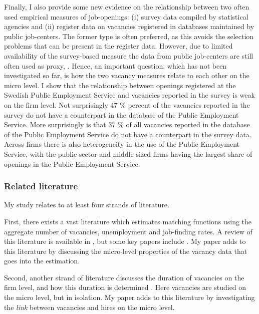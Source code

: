 Finally, I also provide some new evidence on the relationship between two often used empirical measures of job-openings: (i) survey data compiled by statistical agencies and (ii) register data on vacancies registered in databases maintained by public job-centers. The former type is often preferred, as this avoids the selection problems that can be present in the register data. However, due to limited availability of the survey-based measure \citep{Elsby2015} the data from public job-centers are still often used as proxy, \citep{Berman1997, Carlsson2013, Hansen2004,  Wall2002, Yashiv2000}. Hence, an important question, which has not been investigated so far, is how the two vacancy measures relate to each other on the micro level. I show that the relationship between openings registered at the Swedish Public Employment Service and vacancies reported in the survey is weak on the firm level. Not surprisingly 47 \% percent of the vacancies reported in the survey do not have a counterpart in the database of the Public Employment Service. More surprisingly is that 37 \% of all vacancies reported in the database of the Public Employment Service do not have a counterpart in the survey data. Across firms there is also heterogeneity in the use of the Public Employment Service, with the public sector and middle-sized firms having the largest share of openings in the Public Employment Service. 

\subsubsection{Related literature}

My study relates to at least four strands of literature. 

First, there exists a vast literature which estimates matching functions using the aggregate number of vacancies, unemployment and job-finding rates. A review of this literature is available in \cite{Pissarides2000}, but some key papers include \cite{Blanchard1990, Berman1997, Yashiv2000, Hansen2004, Sunde2007, Gross1997, Entorf1998, Feve1996}. My paper adds to this literature by discussing the micro-level properties of the vacancy data that goes into the estimation. 

Second, another strand of literature discusses the duration of vacancies on the firm level, and how this duration is determined \citep{Ours1991, Burdett1998, Barron1997, Holzer1990}. Here vacancies are studied on the micro level, but in isolation. My paper adds to this literature by investigating the \emph{link} between vacancies and hires on the micro level. 

